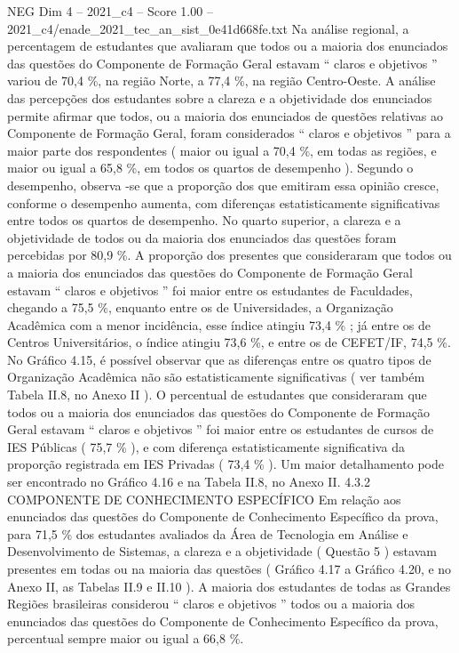 \begin{textsample}{NEG Dim 4 – 2021\_c4 – Score 1.00 – 2021\_c4/enade\_2021\_tec\_an\_sist\_0e41d668fe.txt}
Na análise regional, a percentagem de estudantes que avaliaram que todos ou a maioria dos enunciados das questões do Componente de Formação Geral estavam “ claros e objetivos ” variou de 70,4 \%, na região Norte, a 77,4 \%, na região Centro-Oeste.
A análise das percepções dos estudantes sobre a clareza e a objetividade dos enunciados permite afirmar que todos, ou a maioria dos enunciados de questões relativas ao Componente de Formação Geral, foram considerados “ claros e objetivos ” para a maior parte dos respondentes ( maior ou igual a 70,4 \%, em todas as regiões, e maior ou igual a 65,8 \%, em todos os quartos de desempenho ).
Segundo o desempenho, observa -se que a proporção dos que emitiram essa opinião cresce, conforme o desempenho aumenta, com diferenças estatisticamente significativas entre todos os quartos de desempenho.
No quarto superior, a clareza e a objetividade de todos ou da maioria dos enunciados das questões foram percebidas por 80,9 \%.
A proporção dos presentes que consideraram que todos ou a maioria dos enunciados das questões do Componente de Formação Geral estavam “ claros e objetivos ” foi maior entre os estudantes de Faculdades, chegando a 75,5 \%, enquanto entre os de Universidades, a Organização Acadêmica com a menor incidência, esse índice atingiu 73,4 \% ; já entre os de Centros Universitários, o índice atingiu 73,6 \%, e entre os de CEFET/IF, 74,5 \%.
No Gráfico 4.15, é possível observar que as diferenças entre os quatro tipos de Organização Acadêmica não são estatisticamente significativas ( ver também Tabela II.8, no Anexo II ).
O percentual de estudantes que consideraram que todos ou a maioria dos enunciados das questões do Componente de Formação Geral estavam “ claros e objetivos ” foi maior entre os estudantes de cursos de IES Públicas ( 75,7 \% ), e com diferença estatisticamente significativa da proporção registrada em IES Privadas ( 73,4 \% ).
Um maior detalhamento pode ser encontrado no Gráfico 4.16 e na Tabela II.8, no Anexo II. 4.3.2 COMPONENTE DE CONHECIMENTO ESPECÍFICO Em relação aos enunciados das questões do Componente de Conhecimento Específico da prova, para 71,5 \% dos estudantes avaliados da Área de Tecnologia em Análise e Desenvolvimento de Sistemas, a clareza e a objetividade ( Questão 5 ) estavam presentes em todas ou na maioria das questões ( Gráfico 4.17 a Gráfico 4.20, e no Anexo II, as Tabelas II.9 e II.10 ).
A maioria dos estudantes de todas as Grandes Regiões brasileiras considerou “ claros e objetivos ” todos ou a maioria dos enunciados das questões do Componente de Conhecimento Específico da prova, percentual sempre maior ou igual a 66,8 \%.

\end{textsample}
